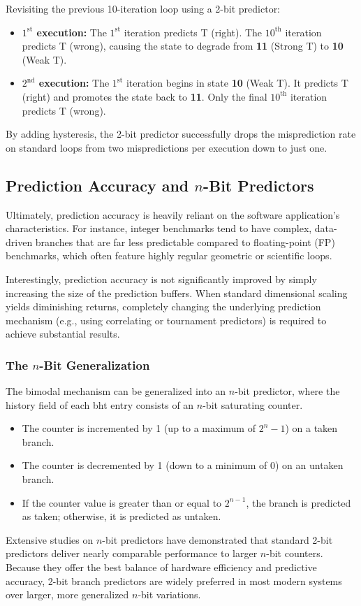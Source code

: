 Revisiting the previous 10-iteration loop using a 2-bit predictor:
\begin{itemize}
    \item \textbf{\(1^{\text{st}}\) execution:} The \(1^{\text{st}}\) iteration predicts T (right). The \(10^{\text{th}}\) iteration predicts T (wrong), causing the state to degrade from \textbf{11} (Strong T) to \textbf{10} (Weak T).
    \item \textbf{\(2^{\text{nd}}\) execution:} The \(1^{\text{st}}\) iteration begins in state \textbf{10} (Weak T). It predicts T (right) and promotes the state back to \textbf{11}. Only the final \(10^{\text{th}}\) iteration predicts T (wrong).
\end{itemize}
By adding hysteresis, the 2-bit predictor successfully drops the misprediction rate on standard loops from two mispredictions per execution down to just one.

\subsection{Prediction Accuracy and \texorpdfstring{\(n\)}{n}-Bit Predictors}

Ultimately, prediction accuracy is heavily reliant on the software application's characteristics. For instance, integer benchmarks tend to have complex, data-driven branches that are far less predictable compared to floating-point (FP) benchmarks, which often feature highly regular geometric or scientific loops.

Interestingly, prediction accuracy is not significantly improved by simply increasing the size of the prediction buffers. When standard dimensional scaling yields diminishing returns, completely changing the underlying prediction mechanism (e.g., using correlating or tournament predictors) is required to achieve substantial results.

\subsubsection*{The \(n\)-Bit Generalization}
The bimodal mechanism can be generalized into an \(n\)-bit predictor, where the history field of each \gls{bht} entry consists of an \(n\)-bit saturating counter. 
\begin{itemize}
    \item The counter is incremented by 1 (up to a maximum of \(2^n - 1\)) on a taken branch.
    \item The counter is decremented by 1 (down to a minimum of 0) on an untaken branch.
    \item If the counter value is greater than or equal to \(2^{n-1}\), the branch is predicted as taken; otherwise, it is predicted as untaken.
\end{itemize}
Extensive studies on \(n\)-bit predictors have demonstrated that standard 2-bit predictors deliver nearly comparable performance to larger \(n\)-bit counters. Because they offer the best balance of hardware efficiency and predictive accuracy, 2-bit branch predictors are widely preferred in most modern systems over larger, more generalized \(n\)-bit variations.

